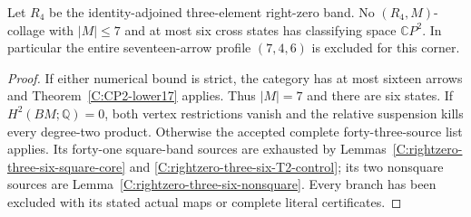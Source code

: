 \begin{theorem}
\label{C:rightzero-three-six-state-excluded}
Let $R_4$ be the identity-adjoined three-element right-zero band.
No $(R_4,M)$-collage with $|M|\leq7$ and at most six cross states
has classifying space $\mathbb CP^2$.  In particular the entire
seventeen-arrow profile $(7,4,6)$ is excluded for this corner.
\end{theorem}
\begin{proof}
If either numerical bound is strict, the category has at most
sixteen arrows and Theorem~\ref{C:CP2-lower17} applies.  Thus
$|M|=7$ and there are six states.  If $H^2(BM;\mathbb Q)=0$,
both vertex restrictions vanish and the relative suspension
kills every degree-two product.  Otherwise the accepted complete
forty-three-source list applies.  Its forty-one square-band
sources are exhausted by
Lemmas~\ref{C:rightzero-three-six-square-core} and
\ref{C:rightzero-three-six-T2-control}; its two nonsquare sources
are Lemma~\ref{C:rightzero-three-six-nonsquare}.  Every branch
has been excluded with its stated actual maps or complete
literal certificates.
\end{proof}
